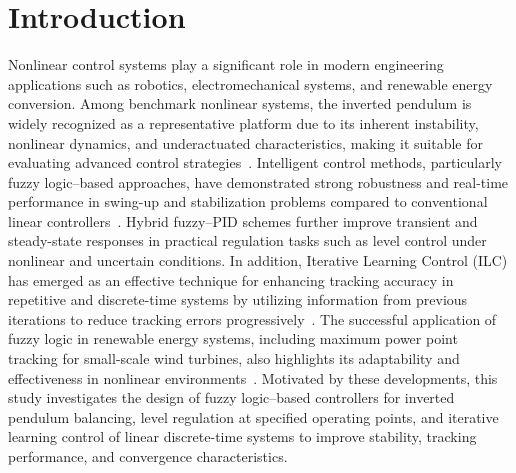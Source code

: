 \section{Introduction}

Nonlinear control systems play a significant role in modern engineering applications such as robotics, electromechanical systems, and renewable energy conversion. Among benchmark nonlinear systems, the inverted pendulum is widely recognized as a representative platform due to its inherent instability, nonlinear dynamics, and underactuated characteristics, making it suitable for evaluating advanced control strategies~\cite{ref1,ref2}. Intelligent control methods, particularly fuzzy logic--based approaches, have demonstrated strong robustness and real-time performance in swing-up and stabilization problems compared to conventional linear controllers~\cite{ref1,ref3}. Hybrid fuzzy--PID schemes further improve transient and steady-state responses in practical regulation tasks such as level control under nonlinear and uncertain conditions. In addition, Iterative Learning Control (ILC) has emerged as an effective technique for enhancing tracking accuracy in repetitive and discrete-time systems by utilizing information from previous iterations to reduce tracking errors progressively~\cite{ref3}. The successful application of fuzzy logic in renewable energy systems, including maximum power point tracking for small-scale wind turbines, also highlights its adaptability and effectiveness in nonlinear environments~\cite{ref5}. Motivated by these developments, this study investigates the design of fuzzy logic--based controllers for inverted pendulum balancing, level regulation at specified operating points, and iterative learning control of linear discrete-time systems to improve stability, tracking performance, and convergence characteristics.